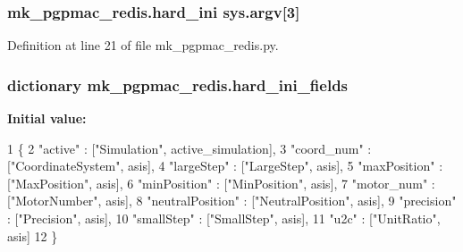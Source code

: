 \hypertarget{namespacemk__pgpmac__redis_a5864d9c27cbe61534756880cbfebe4f1}{
\subsubsection[{hard\-\_\-ini}]{\setlength{\rightskip}{0pt plus 5cm}mk\-\_\-pgpmac\-\_\-redis.\-hard\-\_\-ini sys.\-argv\mbox{[}3\mbox{]}}}\label{namespacemk__pgpmac__redis_a5864d9c27cbe61534756880cbfebe4f1}


Definition at line 21 of file mk\-\_\-pgpmac\-\_\-redis.\-py.

\hypertarget{namespacemk__pgpmac__redis_a8257226983aee079ec66f5cc67e194ec}{
\subsubsection[{hard\-\_\-ini\-\_\-fields}]{\setlength{\rightskip}{0pt plus 5cm}dictionary mk\-\_\-pgpmac\-\_\-redis.\-hard\-\_\-ini\-\_\-fields}}\label{namespacemk__pgpmac__redis_a8257226983aee079ec66f5cc67e194ec}
{\bfseries Initial value\-:}
\begin{DoxyCode}
1 \{
2     \textcolor{stringliteral}{"active"}          : [\textcolor{stringliteral}{"Simulation"}, active\_simulation],
3     \textcolor{stringliteral}{"coord\_num"}       : [\textcolor{stringliteral}{"CoordinateSystem"}, asis],
4     \textcolor{stringliteral}{"largeStep"}       : [\textcolor{stringliteral}{"LargeStep"}, asis],
5     \textcolor{stringliteral}{"maxPosition"}     : [\textcolor{stringliteral}{"MaxPosition"}, asis],
6     \textcolor{stringliteral}{"minPosition"}     : [\textcolor{stringliteral}{"MinPosition"}, asis],
7     \textcolor{stringliteral}{"motor\_num"}       : [\textcolor{stringliteral}{"MotorNumber"}, asis],
8     \textcolor{stringliteral}{"neutralPosition"} : [\textcolor{stringliteral}{"NeutralPosition"}, asis],
9     \textcolor{stringliteral}{"precision"}       : [\textcolor{stringliteral}{"Precision"}, asis],
10     \textcolor{stringliteral}{"smallStep"}       : [\textcolor{stringliteral}{"SmallStep"}, asis],
11     \textcolor{stringliteral}{"u2c"}             : [\textcolor{stringliteral}{"UnitRatio"}, asis]
12     \}
\end{DoxyCode}


